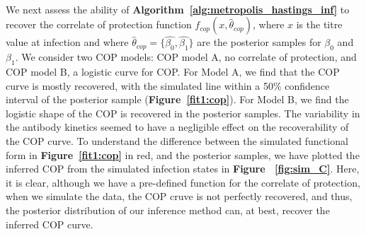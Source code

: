 \paragraph{}We next assess the ability of \textbf{Algorithm~\ref{alg:metropolis_hastings_inf}} to recover the correlate of protection function $f_{cop}(x, \hat{\theta}_{cop})$, where $x$ is the titre value at infection and where $\hat{\theta}_{cop} = \{\hat{\beta_0}, \hat{\beta_1}\}$ are the posterior samples for $\beta_0$ and $\beta_1$. We consider two COP models: COP model A, no correlate of protection, and COP model B, a logistic curve for COP. For Model A, we find that the COP curve is mostly recovered, with the simulated line within a 50\% confidence interval of the posterior sample (\textbf{Figure~\ref{fit1:cop}}). For Model B, we find the logistic shape of the COP is recovered in the posterior samples. The variability in the antibody kinetics seemed to have a negligible effect on the recoverability of the COP curve. To understand the difference between the simulated functional form in \textbf{Figure~\ref{fit1:cop}} in red, and the posterior samples, we have plotted the inferred COP from the simulated infection states in \textbf{Figure ~\ref{fig:sim_C}}. Here, it is clear, although we have a pre-defined function for the correlate of protection, when we simulate the data, the COP cruve is not perfectly recovered, and thus, the posterior distribution of our inference method can, at best, recover the inferred COP curve.

